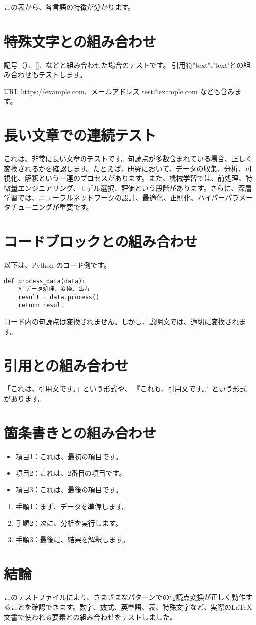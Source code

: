 \documentclass{article}
\begin{document}
この表から、各言語の特徴が分かります。

\section{特殊文字との組み合わせ}

記号（）、[]、{}などと組み合わせた場合のテストです。
引用符"text"、'text'との組み合わせもテストします。

URL https://example.com、メールアドレス test@example.com なども含みます。

\section{長い文章での連続テスト}

これは、非常に長い文章のテストです。句読点が多数含まれている場合、正しく変換されるかを確認します。たとえば、研究において、データの収集、分析、可視化、解釈という一連のプロセスがあります。また、機械学習では、前処理、特徴量エンジニアリング、モデル選択、評価という段階があります。さらに、深層学習では、ニューラルネットワークの設計、最適化、正則化、ハイパーパラメータチューニングが重要です。

\section{コードブロックとの組み合わせ}

以下は、Python のコード例です。

\begin{verbatim}
def process_data(data):
    # データ処理、変換、出力
    result = data.process()
    return result
\end{verbatim}

コード内の句読点は変換されません。しかし、説明文では、適切に変換されます。

\section{引用との組み合わせ}

「これは、引用文です。」という形式や、
『これも、引用文です。』という形式があります。

\section{箇条書きとの組み合わせ}

\begin{itemize}
\item 項目1：これは、最初の項目です。
\item 項目2：これは、2番目の項目です。
\item 項目3：これは、最後の項目です。
\end{itemize}

\begin{enumerate}
\item 手順1：まず、データを準備します。
\item 手順2：次に、分析を実行します。
\item 手順3：最後に、結果を解釈します。
\end{enumerate}

\section{結論}

このテストファイルにより、さまざまなパターンでの句読点変換が正しく動作することを確認できます。数字、数式、英単語、表、特殊文字など、実際のLaTeX文書で使われる要素との組み合わせをテストしました。
\end{document}

